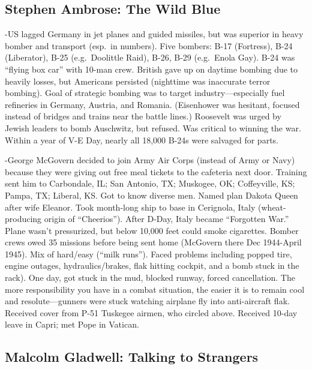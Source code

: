 \documentclass[
]{article}
\begin{document}
\hypertarget{stephen-ambrose-the-wild-blue}{%
\subsection{Stephen Ambrose: The Wild
Blue}\label{stephen-ambrose-the-wild-blue}}

-US lagged Germany in jet planes and guided missiles, but was superior
in heavy bomber and transport (esp.~in numbers). Five bombers: B-17
(Fortress), B-24 (Liberator), B-25 (e.g.~Doolittle Raid), B-26, B-29
(e.g.~Enola Gay). B-24 was ``flying box car'' with 10-man crew. British
gave up on daytime bombing due to heavily losses, but Americans
persisted (nighttime was inaccurate terror bombing). Goal of strategic
bombing was to target industry---especially fuel refineries in Germany,
Austria, and Romania. (Eisenhower was hesitant, focused instead of
bridges and trains near the battle lines.) Roosevelt was urged by Jewish
leaders to bomb Auschwitz, but refused. Was critical to winning the war.
Within a year of V-E Day, nearly all 18,000 B-24s were salvaged for
parts.

-George McGovern decided to join Army Air Corps (instead of Army or
Navy) because they were giving out free meal tickets to the cafeteria
next door. Training sent him to Carbondale, IL; San Antonio, TX;
Muskogee, OK; Coffeyville, KS; Pampa, TX; Liberal, KS. Got to know
diverse men. Named plan Dakota Queen after wife Eleanor. Took month-long
ship to base in Cerignola, Italy (wheat-producing origin of
``Cheerios''). After D-Day, Italy became ``Forgotten War.'' Plane wasn't
pressurized, but below 10,000 feet could smoke cigarettes. Bomber crews
owed 35 missions before being sent home (McGovern there Dec 1944-April
1945). Mix of hard/easy (``milk runs''). Faced problems including popped
tire, engine outages, hydraulics/brakes, flak hitting cockpit, and a
bomb stuck in the rack). One day, got stuck in the mud, blocked runway,
forced cancellation. The more responsibility you have in a combat
situation, the easier it is to remain cool and resolute---gunners were
stuck watching airplane fly into anti-aircraft flak. Received cover from
P-51 Tuskegee airmen, who circled above. Received 10-day leave in Capri;
met Pope in Vatican.

\hypertarget{malcolm-gladwell-talking-to-strangers}{%
\subsection{Malcolm Gladwell: Talking to
Strangers}\label{malcolm-gladwell-talking-to-strangers}}
\end{document}
